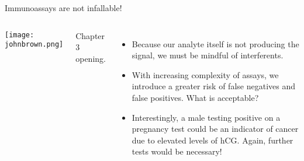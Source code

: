\documentclass[notes=show]{beamer}
\begin{document}
%
%
%

\clearpage

\begin{frame}{Immunoassays are not infallable!}
	\begin{columns}
		\begin{center}
			\texttt{[image: johnbrown.png]}

		\end{center}
		\footnotesize{Chapter 3 opening.}
		\begin{itemize}
			\item Because our analyte itself is not producing the
				signal, we must be mindful of interferents.
			\item With increasing complexity of assays, we introduce
				a greater risk of false negatives and false
				positives. What is acceptable?

				\bigskip

			\item Interestingly, a male testing positive on a
				pregnancy test could be an indicator of cancer
				due to elevated levels of hCG. Again, further
				tests would be necessary!
		\end{itemize}
	\end{columns}
\end{frame}
\end{document}
